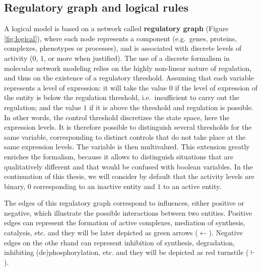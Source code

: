 \documentclass[a4paper,12pt,twoside,onecolumn,openright,final,oldfontcommands]{memoir}
\begin{document}
\subsection{Regulatory graph and logical
rules}\label{regulatory-graph-and-logical-rules}

A logical model is based on a network called \textbf{regulatory graph}
(Figure \ref{fig:logical}), where each node represents a component
(e.g.~genes, proteins, complexes, phenotypes or processes), and is
associated with discrete levels of activity (\(0\), \(1\), or more when
justified). The use of a discrete formalism in molecular network
modeling relies on the highly non-linear nature of regulation, and thus
on the existence of a regulatory threshold. Assuming that each variable
represents a level of expression: it will take the value \(0\) if the
level of expression of the entity is below the regulation threshold,
i.e.~insufficient to carry out the regulation; and the value \(1\) if it
is above the threshold and regulation is possible. In other words, the
control threshold discretizes the state space, here the expression
levels. It is therefore possible to distinguish several thresholds for
the same variable, corresponding to distinct controls that do not take
place at the same expression levels. The variable is then multivalued.
This extension greatly enriches the formalism, because it allows to
distinguish situations that are qualitatively different and that would
be confused with boolean variables. In the continuation of this thesis,
we will consider by default that the activity levels are binary, \(0\)
corresponding to an inactive entity and \(1\) to an active entity.

The edges of this regulatory graph correspond to influences, either
positive or negative, which illustrate the possible interactions between
two entities. Positive edges can represent the formation of active
complexes, mediation of synthesis, catalysis, etc. and they will be
later depicted as green arrows (\(\leftarrow\)). Negative edges on the
othe rhand can represent inhibition of synthesis, degradation,
inhibiting (de)phosphorylation, etc. and they will be depicted as red
turnstile (\(\vdash\)).
\end{document}
